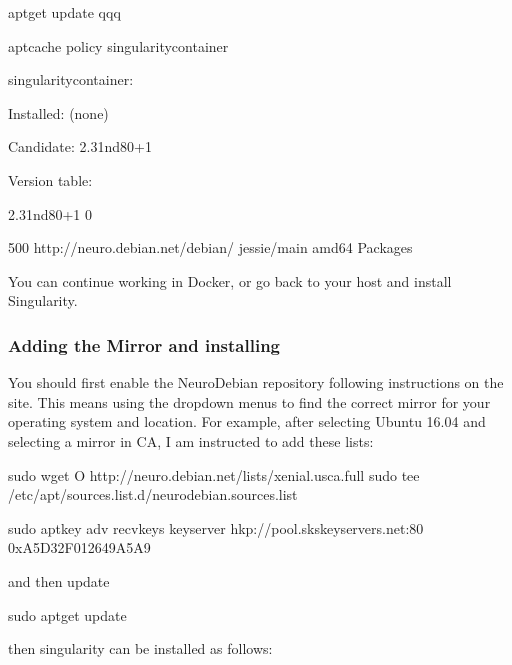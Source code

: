 \documentclass[letterpaper,10pt,english]{sphinxmanual}
\begin{document}
%
\begin{sphinxVerbatim}[commandchars=\\\{\}]
\PYGZdl{} apt\PYGZhy{}get update \PYGZhy{}qqq

\PYGZdl{} apt\PYGZhy{}cache policy singularity\PYGZhy{}container

singularity\PYGZhy{}container:

  Installed: (none)

  Candidate: 2.3\PYGZhy{}1\PYGZti{}nd80+1

  Version table:

    2.3\PYGZhy{}1\PYGZti{}nd80+1 0

      500 http://neuro.debian.net/debian/ jessie/main amd64 Packages
\end{sphinxVerbatim}

You can continue working in Docker, or go back to your host and install Singularity.


\subsubsection{Adding the Mirror and installing}
\label{\detokenize{installation:adding-the-mirror-and-installing}}
You should first enable the NeuroDebian repository following instructions on the  site. This means using the dropdown menus to find the correct mirror for your operating system and location. For example, after selecting Ubuntu 16.04 and selecting a mirror in CA, I am instructed to add these lists:

%
\begin{sphinxVerbatim}[commandchars=\\\{\}]
sudo wget \PYGZhy{}O\PYGZhy{} http://neuro.debian.net/lists/xenial.us\PYGZhy{}ca.full \textbar{} sudo tee /etc/apt/sources.list.d/neurodebian.sources.list

sudo apt\PYGZhy{}key adv \PYGZhy{}\PYGZhy{}recv\PYGZhy{}keys \PYGZhy{}\PYGZhy{}keyserver hkp://pool.sks\PYGZhy{}keyservers.net:80 0xA5D32F012649A5A9
\end{sphinxVerbatim}

and then update

%
\begin{sphinxVerbatim}[commandchars=\\\{\}]
sudo apt\PYGZhy{}get update
\end{sphinxVerbatim}

then singularity can be installed as follows:
\end{document}
